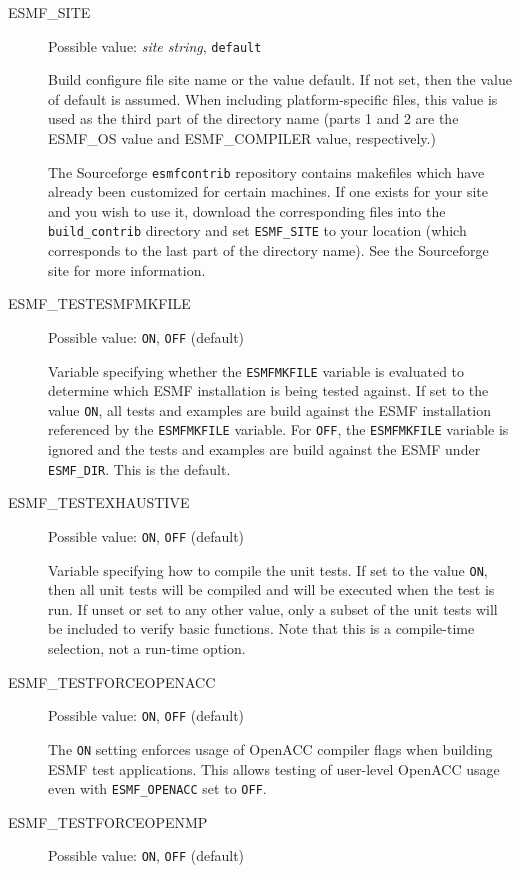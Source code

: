 \begin{description}
\item[ESMF\_SITE]
Possible value: {\em site string}, {\tt default}

Build configure file site name or the value default. If not set, then the value
of default is assumed. When including platform-specific files, this value is
used as the third part of the directory name (parts 1 and 2 are the
ESMF\_OS value and ESMF\_COMPILER value, respectively.)

The Sourceforge {\tt esmfcontrib} repository contains makefiles which have
already been customized for certain machines.  If one exists for your site
and you wish to use it, download the corresponding files into the
{\tt build\_contrib} directory and set {\tt ESMF\_SITE} to your location
(which corresponds to the last part of the directory name).  See the
Sourceforge site
 for more information.

\item[ESMF\_TESTESMFMKFILE]
Possible value: {\tt ON}, {\tt OFF} (default)

Variable specifying whether the {\tt ESMFMKFILE} variable is evaluated to
determine which ESMF installation is being tested against. If set to the
value {\tt ON}, all tests and examples are build against the ESMF installation
referenced by the {\tt ESMFMKFILE} variable. For {\tt OFF}, the
{\tt ESMFMKFILE} variable is ignored and the tests and examples are build
against the ESMF under {\tt ESMF\_DIR}. This is the default.

\item[ESMF\_TESTEXHAUSTIVE]
Possible value: {\tt ON}, {\tt OFF} (default)

Variable specifying how to compile the unit tests. If set to the value {\tt ON},
then all unit tests will be compiled and will be executed when the test is
run.  If unset or set to any other value, only a subset of the unit tests
will be included to verify basic functions. Note that this is a compile-time
selection, not a run-time option.

\item[ESMF\_TESTFORCEOPENACC]
Possible value: {\tt ON}, {\tt OFF} (default)

The {\tt ON} setting enforces usage of OpenACC compiler flags when building ESMF test applications. This allows testing of user-level OpenACC usage even with {\tt ESMF\_OPENACC} set to {\tt OFF}.

\item[ESMF\_TESTFORCEOPENMP]
Possible value: {\tt ON}, {\tt OFF} (default)


\end{description}
